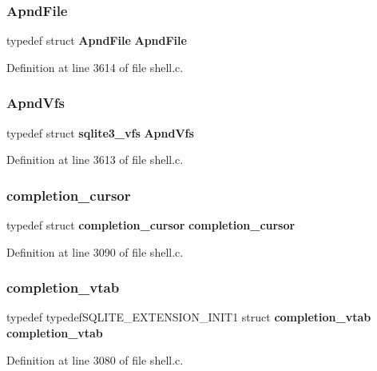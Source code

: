 \subsubsection{Apnd\+File}
{\footnotesize\ttfamily typedef struct \textbf{ Apnd\+File} \textbf{ Apnd\+File}}



Definition at line 3614 of file shell.\+c.

\mbox{\label{shell_8c_a48821dd8b93e5fc5cdcddf53274b2740}} 
\subsubsection{Apnd\+Vfs}
{\footnotesize\ttfamily typedef struct \textbf{ sqlite3\+\_\+vfs} \textbf{ Apnd\+Vfs}}



Definition at line 3613 of file shell.\+c.

\mbox{\label{shell_8c_aa8c9f048c22b0b80873147006457fd50}} 
\subsubsection{completion\+\_\+cursor}
{\footnotesize\ttfamily typedef struct \textbf{ completion\+\_\+cursor} \textbf{ completion\+\_\+cursor}}



Definition at line 3090 of file shell.\+c.

\mbox{\label{shell_8c_af878c04db92ed2d05faac2f436a879ae}} 
\subsubsection{completion\+\_\+vtab}
{\footnotesize\ttfamily typedef typedef\+S\+Q\+L\+I\+T\+E\+\_\+\+E\+X\+T\+E\+N\+S\+I\+O\+N\+\_\+\+I\+N\+I\+T1 struct \textbf{ completion\+\_\+vtab} \textbf{ completion\+\_\+vtab}}



Definition at line 3080 of file shell.\+c.

\mbox{\label{shell_8c_a7fc13a21ae5da271984d3f211f91738a}} 
